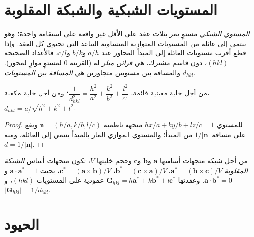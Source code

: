 \section{المستويات الشبكية والشبكة المقلوبة}

\begin{definition}\label{def:b3:x-ray-diffraction:miller}
\emph{المستوي الشبكي} مستوٍ يمر بثلاث عقد على الأقل
غير واقعة على استقامة واحدة؛ وهو ينتمي إلى عائلة من المستويات المتوازية المتساوية التباعد
التي تحتوي كل العقد. وإذا قطع أقرب مستويات العائلة إلى المبدأ
المحاور عند $a/h$ و$b/k$ و$c/l$، فالأعداد الصحيحة $(hkl)$، دون قاسم مشترك،
هي \emph{قرائن ميلر} له (القرينة 0 لمستوٍ
موازٍ لمحور). والمسافة بين مستويين متجاورين هي
\emph{المسافة بين المستويات} $d_{hkl}$.
\end{definition}

\begin{proposition}\label{prop:b3:x-ray-diffraction:spacing}
من أجل خلية معينية قائمة، $\dfrac{1}{d_{hkl}^2} = \dfrac{h^2}{a^2} + \dfrac{k^2}{b^2} +
\dfrac{l^2}{c^2}$؛ ومن أجل خلية مكعبة، $d_{hkl} = a/\sqrt{h^2 + k^2 + l^2}$.
\end{proposition}

\begin{proof}
للمستوي $hx/a + ky/b + lz/c = 1$ متجهة ناظمية $\mathbf n = (h/a, k/b, l/c)$
ويقع على مسافة $1/|\mathbf n|$ من المبدأ؛ والمستوي الموازي المار
بالمبدأ ينتمي إلى العائلة، ومنه $d = 1/|\mathbf n|$.
\end{proof}

\begin{definition}\label{def:b3:x-ray-diffraction:reciprocal}
من أجل شبكة متجهات أساسها $\mathbf a$ و$\mathbf b$ و$\mathbf c$ وحجم خليتها $V$،
تكون متجهات أساس \emph{الشبكة المقلوبة}
$\mathbf a^* = (\mathbf b\times\mathbf c)/V$، $\mathbf b^* = (\mathbf c\times\mathbf a)/V$،
$\mathbf c^* = (\mathbf a\times\mathbf b)/V$، بحيث $\mathbf a\cdot\mathbf a^* = 1$ 
و$\mathbf a\cdot\mathbf b^* = 0$. وعقدتها $\mathbf G_{hkl} = h\mathbf a^* + k\mathbf b^* + l\mathbf c^*$
عمودية على المستويات $(hkl)$، و$|\mathbf G_{hkl}| = 1/d_{hkl}$.
\end{definition}

\section{الحيود}

